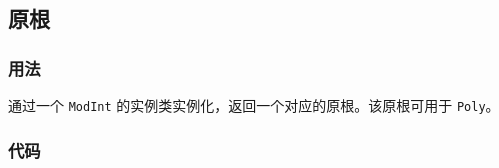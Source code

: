 \subsection{原根}

\subsubsection{用法}

通过一个 \lstinline{ModInt} 的实例类实例化，返回一个对应的原根。该原根可用于 \lstinline{Poly}。

\subsubsection{代码}


